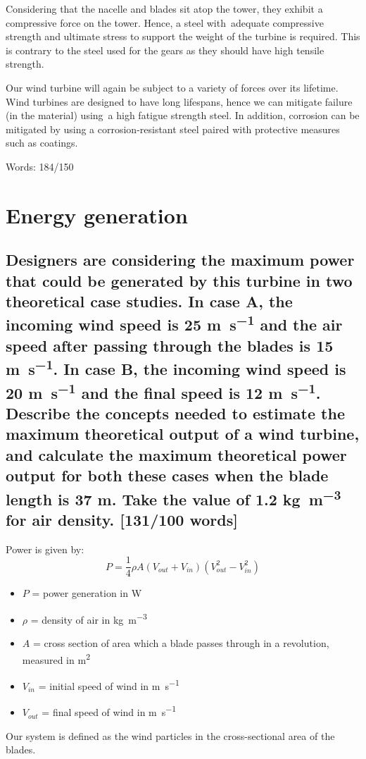 \documentclass[12pt]{article}
\numberwithin{equation}{section}
\begin{document}
\begin{flushleft}
Considering that the nacelle and blades sit atop the tower, they exhibit a compressive force on the tower. Hence, a steel with adequate compressive strength and ultimate stress to support the weight of the turbine is required. This is contrary to the steel used for the gears as they should have high tensile strength. 

Our wind turbine will again be subject to a variety of forces over its lifetime. Wind turbines are designed to have long lifespans, hence we can mitigate failure (in the material) using a high fatigue strength steel. In addition, corrosion can be mitigated by using a corrosion-resistant steel paired with protective measures such as coatings.

Words: 184/150

\section{Energy generation}
\subsection[Maximum power generation.]{Designers are considering the maximum power that could be generated by this turbine in two theoretical case studies. In case A, the incoming wind speed is 25 \si{\meter\per\second} and the air speed after passing through the blades is 15 \si{\meter\per\second}. In case B, the incoming wind speed is 20 \si{\meter\per\second} and the final speed is 12 \si{\meter\per\second}. Describe the concepts needed to estimate the maximum theoretical output of a wind turbine, and calculate the maximum theoretical power output for both these cases when the blade length is 37 \si{\meter}. Take the value of 1.2 \si{\kg\per\meter\cubed} for air density. [131/100 words]}
Power is given by:
\begin{equation}
  P = \frac{1}{4} \rho A (V_{out} + V_{in})(V_{out}^2 - V_{in}^2)
\end{equation}
\begin{itemize}
  \item $P$ = power generation in \si{\watt}
  \item $\rho$ = density of air in \si{\kg\per\meter\cubed}
  \item $A$ = cross section of area which a blade passes through in a revolution, measured in \si{\meter\squared}
  \item $V_{in}$ = initial speed of wind in \si{\meter\per\second}
  \item $V_{out}$ = final speed of wind in \si{\meter\per\second}
\end{itemize}
Our system is defined as the wind particles in the cross-sectional area of the blades.

\end{flushleft}
\end{document}
